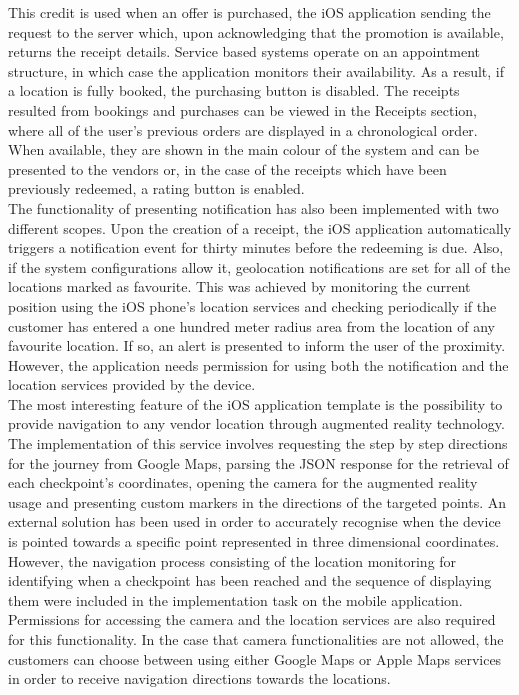 This credit is used when an offer is purchased, the iOS application sending the request to the server which, upon acknowledging that the promotion is available, returns the receipt details. Service based systems operate on an appointment structure, in which case the application monitors their availability. As a result, if a location is fully booked, the purchasing button is disabled. The receipts resulted from bookings and purchases can be viewed in the Receipts section, where all of the user's previous orders are displayed in a chronological order. When available, they are shown in the main colour of the system and can be presented to the vendors or, in the case of the receipts which have been previously redeemed, a rating button is enabled.\\

The functionality of presenting notification has also been implemented with two different scopes. Upon the creation of a receipt, the iOS application automatically triggers a notification event for thirty minutes before the redeeming is due. Also, if the system configurations allow it, geolocation notifications are set for all of the locations marked as favourite. This was achieved by monitoring the current position using the iOS phone's location services and checking periodically if the customer has entered a one hundred meter radius area from the location of any favourite location. If so, an alert is presented to inform the user of the proximity. However, the application needs permission for using both the notification and the location services provided by the device.\\

The most interesting feature of the iOS application template is the possibility to provide navigation to any vendor location through augmented reality technology. The implementation of this service involves requesting the step by step directions for the journey from Google Maps, parsing the JSON response for the retrieval of each checkpoint's coordinates, opening the camera for the augmented reality usage and presenting custom markers in the directions of the targeted points. An external solution has been used in order to accurately recognise when the device is pointed towards a specific point represented in three dimensional coordinates. However, the navigation process consisting of the location monitoring for identifying when a checkpoint has been reached and the sequence of displaying them were included in the implementation task on the mobile application. Permissions for accessing the camera and the location services are also required for this functionality. In the case that camera functionalities are not allowed, the customers can choose between using either Google Maps or Apple Maps services in order to receive navigation directions towards the locations.\\

